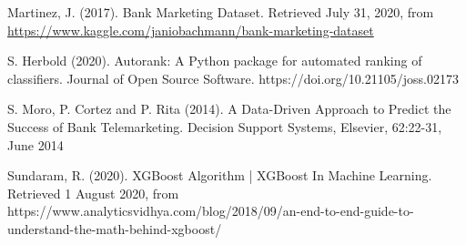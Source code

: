 \documentclass[12pt]{article}
\begin{document}
\begin{thebibliography}{999}

	Martinez, J. (2017). Bank Marketing Dataset. Retrieved July 31, 2020, from {\url{https://www.kaggle.com/janiobachmann/bank-marketing-dataset}}

   
	S. Herbold (2020). Autorank: A Python package for automated ranking of classifiers. Journal of Open Source Software. https://doi.org/10.21105/joss.02173
	
S. Moro, P. Cortez and P. Rita (2014). A Data-Driven Approach to Predict the Success of Bank Telemarketing. Decision Support Systems, Elsevier, 62:22-31, June 2014

Sundaram, R. (2020). XGBoost Algorithm | XGBoost In Machine Learning. Retrieved 1 August 2020, from https://www.analyticsvidhya.com/blog/2018/09/an-end-to-end-guide-to-understand-the-math-behind-xgboost/


\end{thebibliography}
\end{document}
